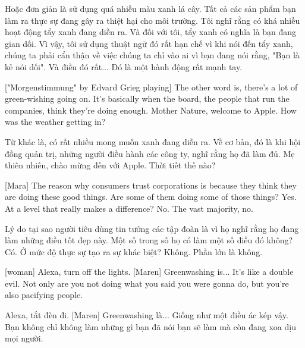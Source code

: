 \documentclass[a4paper]{article}
\begin{document}
	\begin{vietnamese-v2}
		[Mara] Hoặc đơn giản là sử dụng quá nhiều màu xanh lá cây.
		Tất cả các sản phẩm bạn làm ra thực sự đang gây ra thiệt hại cho môi trường.
		Tôi nghĩ rằng có khá nhiều hoạt động tẩy xanh đang diễn ra.
		Và đối với tôi, tẩy xanh có nghĩa là bạn đang gian dối.
		Vì vậy, tôi sử dụng thuật ngữ đó rất hạn chế vì khi nói đến tẩy xanh, chúng ta phải cẩn thận về việc chúng ta chỉ vào ai vì bạn đang nói rằng, "Bạn là kẻ nói dối".
		Và điều đó rất... Đó là một hành động rất mạnh tay.
	\end{vietnamese-v2}
	
	["Morgenstimmung" by Edvard Grieg playing]
	The other word is, there's a lot of green-wishing going on.
	It's basically when the board, the people that run the companies, think they're doing enough.
	Mother Nature, welcome to Apple.
	How was the weather getting in?
	
	\begin{vietnamese-v2}
		Từ khác là, có rất nhiều mong muốn xanh đang diễn ra.
		Về cơ bản, đó là khi hội đồng quản trị, những người điều hành các công ty, nghĩ rằng họ đã làm đủ.
		Mẹ thiên nhiên, chào mừng đến với Apple.
		Thời tiết thế nào?
	\end{vietnamese-v2}
	
	[Mara] The reason why consumers trust corporations is because they think they are doing these good things.
	Are some of them doing some of those things? Yes.
	At a level that really makes a difference? No.
	The vast majority, no.
	
	\begin{vietnamese-v2}
		[Mara] Lý do tại sao người tiêu dùng tin tưởng các tập đoàn là vì họ nghĩ rằng họ đang làm những điều tốt đẹp này.
		Một số trong số họ có làm một số điều đó không? Có.
		Ở mức độ thực sự tạo ra sự khác biệt? Không.
		Phần lớn là không.
	\end{vietnamese-v2}
	
	[woman] Alexa, turn off the lights.
	[Maren] Greenwashing is... It's like a double evil.
	Not only are you not doing what you said you were gonna do, but you're also pacifying people.
	
	\begin{vietnamese-v2}
		[phụ nữ] Alexa, tắt đèn đi.
		[Maren] Greenwashing là... Giống như một điều ác kép vậy.
		Bạn không chỉ không làm những gì bạn đã nói bạn sẽ làm mà còn đang xoa dịu mọi người.
	\end{vietnamese-v2}
	
\end{document}
